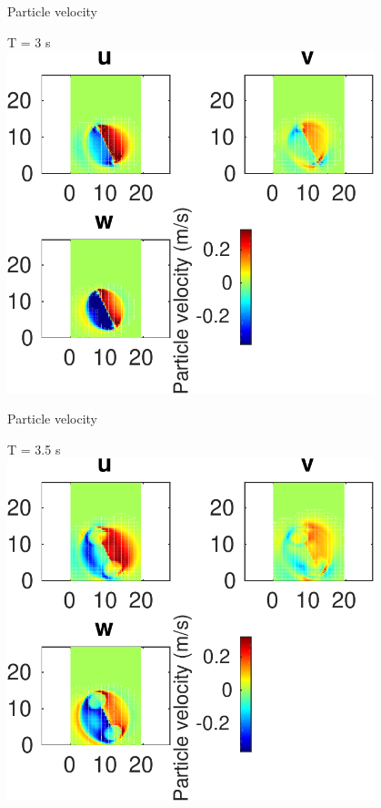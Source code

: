 \documentclass{beamer}
\begin{document}
\begin{frame}
 {Particle velocity}
 
 \centering \Large T = 3 s\\
 \includegraphics[width=0.8\textwidth]{images/horizontal_velo_00036}
 
\end{frame}

\begin{frame}
 {Particle velocity}
 
 \centering \Large T = 3.5 s\\
 \includegraphics[width=0.8\textwidth]{images/horizontal_velo_00041}
 
\end{frame}
\end{document}
